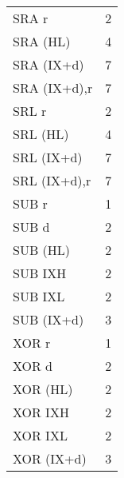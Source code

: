 \begin{ttfamily}
\begin{multicols}{3}
\begin{tabular}{lc}
SRA r       & 2 \\
SRA (HL)    & 4 \\
SRA (IX+d)    & 7 \\
SRA (IX+d),r   & 7 \\

SRL r       & 2 \\
SRL (HL)    & 4 \\
SRL (IX+d)    & 7 \\
SRL (IX+d),r   & 7 \\

SUB r         & 1 \\
SUB d         & 2 \\
SUB (HL) & 2\\
SUB IXH & 2 \\
SUB IXL & 2 \\
SUB (IX+d) & 3 \\

XOR r       & 1 \\
XOR d       & 2 \\
XOR (HL)    & 2 \\
XOR IXH     & 2 \\
XOR IXL     & 2 \\
XOR (IX+d)  & 3 \\

\end{tabular}



\end{multicols}
\end{ttfamily}
